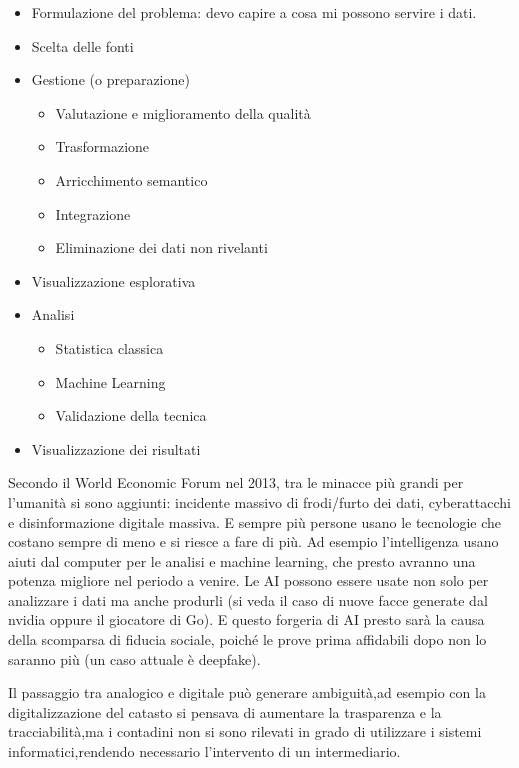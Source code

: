 \documentclass[a4page, 11pt]{article}
\begin{document}
\begin{itemize}
	\item
	Formulazione del problema: devo capire a cosa mi possono servire i
	dati.
	\item
	Scelta delle fonti
	\item
	Gestione (o preparazione)
	
	\begin{itemize}
		 
		\item
		Valutazione e miglioramento della qualità
		\item
		Trasformazione
		\item
		Arricchimento semantico
		\item
		Integrazione
		\item
		Eliminazione dei dati non rivelanti
	\end{itemize}
	\item
	Visualizzazione esplorativa
	\item
	Analisi
	
	\begin{itemize}
		 
		\item
		Statistica classica
		\item
		Machine Learning
		\item
		Validazione della tecnica
	\end{itemize}
	\item
	Visualizzazione dei risultati
\end{itemize}

Secondo il World Economic Forum nel 2013, tra le minacce più grandi per
l'umanità si sono aggiunti: incidente massivo di frodi/furto dei dati,
cyberattacchi e disinformazione digitale massiva. E sempre più persone
usano le tecnologie che costano sempre di meno e si riesce a fare di
più. Ad esempio l'intelligenza usano aiuti dal computer per le analisi e
machine learning, che presto avranno una potenza migliore nel periodo a
venire. Le AI possono essere usate non solo per analizzare i dati ma
anche produrli (si veda il caso di nuove facce generate dal nvidia
oppure il giocatore di Go). E questo forgeria di AI presto sarà la causa
della scomparsa di fiducia sociale, poiché le prove prima affidabili
dopo non lo saranno più (un caso attuale è deepfake).

Il passaggio tra analogico e digitale può generare ambiguità,ad esempio
con la digitalizzazione del catasto si pensava di aumentare la trasparenza
e la tracciabilità,ma i contadini non si sono rilevati in grado di
utilizzare i sistemi informatici,rendendo necessario l'intervento
di un intermediario.
\end{document}
